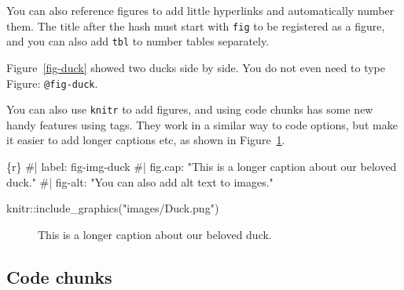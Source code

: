 \documentclass[
  letterpaper,
  DIV=11,
  numbers=noendperiod]{scrreprt}
\newenvironment{Shaded}{\begin{snugshade}}{\end{snugshade}}
\newcommand{\InformationTok}[1]{\textcolor[rgb]{0.37,0.37,0.37}{#1}}
\begin{document}
You can also reference figures to add little hyperlinks and
automatically number them. The title after the hash must start with
\texttt{fig} to be registered as a figure, and you can also add
\texttt{tbl} to number tables separately.

Figure~\ref{fig-duck} showed two ducks side by side. You do not even
need to type Figure: \texttt{@fig-duck}.

You can also use \texttt{knitr} to add figures, and using code chunks
has some new handy features using tags. They work in a similar way to
code options, but make it easier to add longer captions etc, as shown in
Figure~\ref{fig-img-duck}.

\begin{Shaded}
\begin{Highlighting}[]
\InformationTok{\textasciigrave{}\textasciigrave{}\textasciigrave{}\{r\}}
\InformationTok{\#| label: fig{-}img{-}duck}
\InformationTok{\#| fig.cap: "This is a longer caption about our beloved duck."}
\InformationTok{\#| fig{-}alt: "You can also add alt text to images."}

\InformationTok{knitr::include\_graphics("images/Duck.png")}
\InformationTok{\textasciigrave{}\textasciigrave{}\textasciigrave{}}
\end{Highlighting}
\end{Shaded}

\begin{figure}


\caption{\label{fig-img-duck}This is a longer caption about our beloved
duck.}

\end{figure}%

\subsection{Code chunks}\label{code-chunks}
\end{document}
